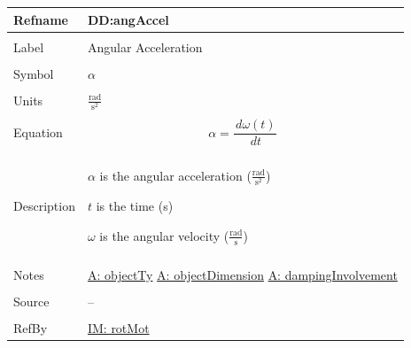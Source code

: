 \documentclass[12pt]{article}
\begin{document}
\noindent \begin{minipage}{\textwidth}
\begin{tabular}{>{\raggedright}p{}>{\raggedright\arraybackslash}p{}}
\toprule \textbf{Refname} & \textbf{DD:angAccel}
\label{DD:angAccel}
\\ \midrule \\
Label & Angular Acceleration
\\ \midrule \\
Symbol & $α$
\\ \midrule \\
Units & $\frac{\text{rad}}{\text{s}^{2}}$
\\ \midrule \\
Equation & \begin{displaymath}
           α=\frac{\,dω\left(t\right)}{\,dt}
           \end{displaymath}
\\ \midrule \\
Description & \begin{symbDescription}
              \item{$α$ is the angular acceleration ($\frac{\text{rad}}{\text{s}^{2}}$)}
              \item{$t$ is the time (s)}
              \item{$ω$ is the angular velocity ($\frac{\text{rad}}{\text{s}}$)}
              \end{symbDescription}
\\ \midrule \\
Notes & \hyperref[assumpOT]{A: objectTy}
        \hyperref[assumpOD]{A: objectDimension}
        \hyperref[assumpDI]{A: dampingInvolvement}
\\ \midrule \\
Source & --
\\ \midrule \\
RefBy & \hyperref[IM:rotMot]{IM: rotMot}
\\ \bottomrule
\end{tabular}
\end{minipage}
\par~
\end{document}
